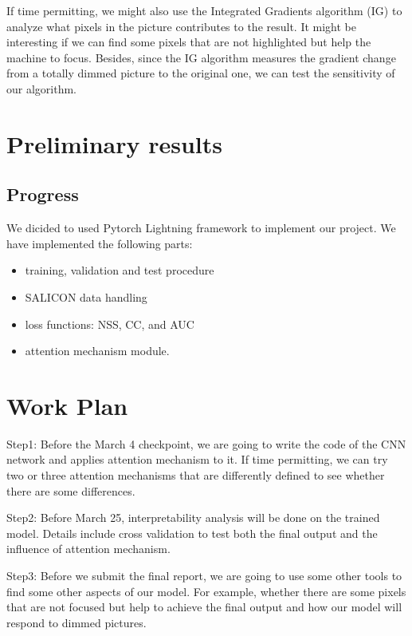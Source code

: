 \documentclass[12pt]{article}
\begin{document}
If time permitting, we might also use the Integrated Gradients algorithm (IG) \cite{sundararajan2017axiomatic} to analyze what pixels in the picture contributes to the result. 
It might be interesting if we can find some pixels that are not highlighted but help the machine to focus. 
Besides, since the IG algorithm measures the gradient change from a totally dimmed picture to the original one, we can test the sensitivity of our algorithm.

\section{Preliminary results}
\subsection{Progress}
We dicided to used Pytorch Lightning framework \cite{falcon2019pytorch} to implement our project.
We have implemented the following parts:
\begin{itemize}
    \item training, validation and test procedure
    \item SALICON data handling
    \item loss functions: NSS, CC, and AUC
    \item attention mechanism module.
\end{itemize}


\section{Work Plan}

Step1: Before the March 4 checkpoint, we are going to write the code of the CNN network and applies attention mechanism to it. 
If time permitting, we can try two or three attention mechanisms that are differently defined to see whether there are some differences. 

Step2: Before March 25, interpretability analysis will be done on the trained model. Details include cross validation to test both the final output and the influence of attention mechanism. 

Step3: Before we submit the final report, we are going to use some other tools to find some other aspects of our model. 
For example, whether there are some pixels that are not focused but help to achieve the final output and how our model will respond to dimmed pictures. 

\newpage



\end{document}
